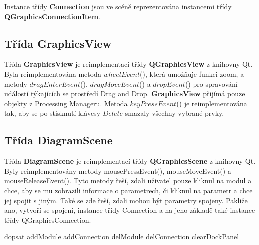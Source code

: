 Instance třídy \textbf{Connection} jsou ve scéně reprezentována instancemi třídy \textbf{QGraphicsConnectionItem}.

\subsection*{Třída GraphicsView}
Třída \textbf{GraphicsView} je reimplementací třídy \textbf{QGraphicsView} z knihovny Qt. Byla reimplementována metoda $wheelEvent$(), která umožňuje funkci zoom, a  metody $dragEnterEvent$(), $dragMoveEvent$() a $dropEvent$() pro spravování událostí týkajících se prostředí Drag and Drop. \textbf{GraphicsView} přijímá pouze objekty z Processing Manageru. Metoda $keyPressEvent$() je reimplementována tak, aby se po stisknutí klávesy $Delete$ smazaly všechny vybrané prvky. 


\subsection*{Třída DiagramScene}
Třída \textbf{DiagramScene} je reimplementací třídy \textbf{QGraphicsScene} z knihovny Qt. Byly reimplementovány metody mousePressEvent(), mouseMoveEvent() a mouseReleaseEvent(). Tyto metody řeší, zdali uživatel pouze kliknul na modul a chce, aby se mu zobrazili informace o parametrech, či kliknul na parametr a chce jej spojit s jiným. Také se zde řeší, zdali mohou být parametry spojeny. Pakliže ano, vytvoří se spojení, instance třídy Connection a na jeho základě také instance třídy QGraphicsConnection.

dopsat
addModule
addConnection
delModule
delConnection
clearDockPanel
